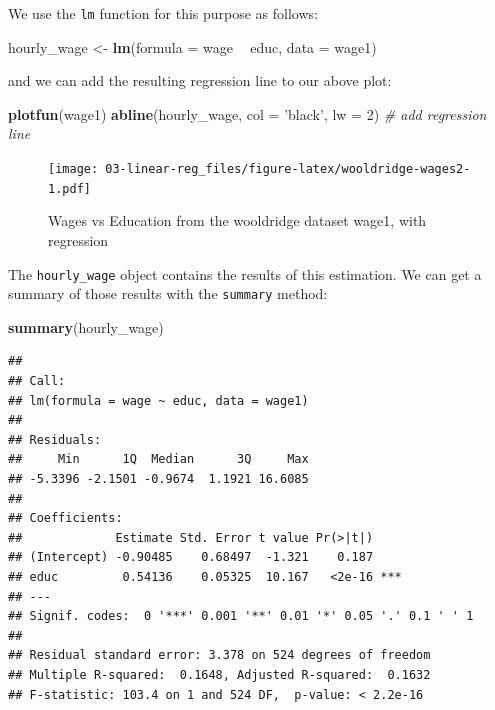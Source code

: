 \documentclass[]{book}
\newenvironment{Shaded}{\begin{snugshade}}{\end{snugshade}}
\newcommand{\KeywordTok}[1]{\textcolor[rgb]{0.13,0.29,0.53}{\textbf{#1}}}
\newcommand{\DataTypeTok}[1]{\textcolor[rgb]{0.13,0.29,0.53}{#1}}
\newcommand{\DecValTok}[1]{\textcolor[rgb]{0.00,0.00,0.81}{#1}}
\newcommand{\StringTok}[1]{\textcolor[rgb]{0.31,0.60,0.02}{#1}}
\newcommand{\CommentTok}[1]{\textcolor[rgb]{0.56,0.35,0.01}{\textit{#1}}}
\newcommand{\OperatorTok}[1]{\textcolor[rgb]{0.81,0.36,0.00}{\textbf{#1}}}
\newcommand{\NormalTok}[1]{#1}
\begin{document}
We use the \texttt{lm} function for this purpose as follows:

\begin{Shaded}
\begin{Highlighting}[]
\NormalTok{hourly_wage <-}\StringTok{ }\KeywordTok{lm}\NormalTok{(}\DataTypeTok{formula =}\NormalTok{ wage }\OperatorTok{~}\StringTok{ }\NormalTok{educ, }\DataTypeTok{data =}\NormalTok{ wage1)}
\end{Highlighting}
\end{Shaded}

and we can add the resulting regression line to our above plot:

\begin{Shaded}
\begin{Highlighting}[]
\KeywordTok{plotfun}\NormalTok{(wage1)}
\KeywordTok{abline}\NormalTok{(hourly_wage, }\DataTypeTok{col =} \StringTok{'black'}\NormalTok{, }\DataTypeTok{lw =} \DecValTok{2}\NormalTok{) }\CommentTok{# add regression line}
\end{Highlighting}
\end{Shaded}

\begin{figure}
\centering
\texttt{[image: 03-linear-reg\_files/figure-latex/wooldridge-wages2-1.pdf]}
\caption{\label{fig:wooldridge-wages2}Wages vs Education from the wooldridge
dataset wage1, with regression}
\end{figure}

The \texttt{hourly\_wage} object contains the results of this
estimation. We can get a summary of those results with the
\texttt{summary} method:

\begin{Shaded}
\begin{Highlighting}[]
\KeywordTok{summary}\NormalTok{(hourly_wage)}
\end{Highlighting}
\end{Shaded}

\begin{verbatim}
## 
## Call:
## lm(formula = wage ~ educ, data = wage1)
## 
## Residuals:
##     Min      1Q  Median      3Q     Max 
## -5.3396 -2.1501 -0.9674  1.1921 16.6085 
## 
## Coefficients:
##             Estimate Std. Error t value Pr(>|t|)    
## (Intercept) -0.90485    0.68497  -1.321    0.187    
## educ         0.54136    0.05325  10.167   <2e-16 ***
## ---
## Signif. codes:  0 '***' 0.001 '**' 0.01 '*' 0.05 '.' 0.1 ' ' 1
## 
## Residual standard error: 3.378 on 524 degrees of freedom
## Multiple R-squared:  0.1648, Adjusted R-squared:  0.1632 
## F-statistic: 103.4 on 1 and 524 DF,  p-value: < 2.2e-16
\end{verbatim}
\end{document}
